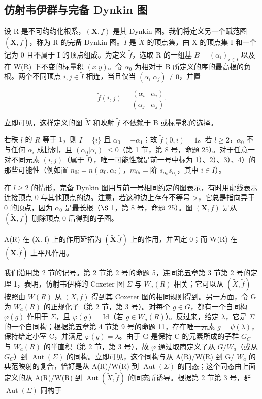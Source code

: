 \subsection{仿射韦伊群与完备 Dynkin 图}

设 R 是不可约约化根系，\((\mathbf{X}, f)\) 是其 Dynkin 图。我们将定义另一个赋范图 \((\tilde{\mathbf{X}}, \tilde{f})\)，称为 R 的完备 Dynkin 图。\(\tilde{I}\) 是 \(\tilde{X}\) 的顶点集，由 X 的顶点集 I 和一个记为 0 且不属于 I 的顶点组成。为定义 \(\tilde{f}\)，选取 R 的一组基 \(B = (\alpha_{i})_{i \in I}\) 以及在 W(R) 下不变的标量积 \((x|y)\)。令 \(\alpha_{0}\) 为相对于 B 所定义的序的最高根的负根。两个不同顶点 \(i, j \in \tilde{I}\) 相连，当且仅当 \((\alpha_{i}|\alpha_{j}) \neq 0\)，并置

\[
\tilde {f} (i, j) = \frac {\left(\alpha_ {i} \mid \alpha_ {i}\right)}{\left(\alpha_ {j} \mid \alpha_ {j}\right)}.
\]

立即可见，这样定义的图 \(\tilde{X}\) 和映射 \(\tilde{f}\) 不依赖于 B 或标量积的选择。

若秩 \(l\) 的 \(R\) 等于 1，则 \(I = \{i\}\) 且 \(\alpha_0 = -\alpha_1\)；故 \(\tilde{f}(0, i) = 1\)。若 \(l \geqslant 2\)，\(\alpha_0\) 不与任何 \(\alpha_i\) 成比例，且 \((\alpha_0|\alpha_i)\) \(\leqslant 0\)（第 1 节，第 8 号，命题 25）。对于任意一对不同元素 \((i,j)\)（属于 \(\tilde{I}\)），唯一可能性就是前一号中标为 1）、2）、3）、4）的那些可能性（例如置 \(n_{0i} = n(\alpha_0, \alpha_i)\)，\(m_{0i} = \text{阶 } s_{\alpha_0}s_{\alpha_i}\)，其中 \(i \in I\)）。

在 \(l \geqslant 2\) 的情形，完备 Dynkin 图用与前一号相同约定的图表示，有时用虚线表示连接顶点 0 与其他顶点的边。注意，若这种边上存在不等号 \textgreater{}，它总是指向异于 0 的顶点，因为 \(\alpha_{0}\) 是最长根（\(\S\) 1，第 8 号，命题 25）。图 \((\mathbf{X}, f)\) 是从 \((\tilde{\mathbf{X}}, f)\) 删除顶点 0 后得到的子图。

A(R) 在 (X. f) 上的作用延拓为 \((\tilde{\mathbf{X}}.\tilde{f})\) 上的作用，并固定 0；而 W(R) 在 \((\tilde{\mathbf{X}}.\tilde{f})\) 上平凡作用。

我们沿用第 2 节的记号。第 2 节第 2 号的命题 5，连同第五章第 3 节第 2 号的定理 1，表明，仿射韦伊群的 Coxeter 图 \(\Sigma\) 与 \(W_{a}(R)\) 相关；它可以从 \((\tilde{X},\tilde{f})\) 按照由 \(W(R)\) 从 \((X,f)\) 得到其 Coxeter 图的相同规则得到。另一方面，令 G 为 \(W_{a}(R)\) 的正规化子（第 2 节，第 3 号）。对每个 \(g\in G\)，都有一个自同构 \(\varphi(g)\) 作用于 \(\Sigma\)，且 \(\varphi(g)=\mathrm{Id}\)（若 \(g\in W_{a}(R)\)）。反过来，给定 \(\lambda\)，它是 \(\Sigma\) 的一个自同构；根据第五章第 4 节第 9 号的命题 11，存在唯一元素 \(g=\psi(\lambda)\)，保持给定小室 C，并满足 \(\varphi(g)=\lambda\)。由于 G 是保持 C 的元素所成的子群 \(G_{C}\) 与 \(W_{a}(R)\) 的半直积（第 2 节，第 3 号），故 \(\varphi\) 通过取商定义了从 \(G/W_{a}\)（或从 \(G_{C}\)）到 \(\operatorname{Aut}(\Sigma)\) 的同构。立即可见，这个同构与从 A(R)/W(R) 到 G/ \(W_{a}\) 的典范映射的复合，恰好是从 A(R)/W(R) 到 \(\operatorname{Aut}(\Sigma)\) 的同态；这个同态由上面定义的从 A(R)/W(R) 到 \(\operatorname{Aut}(\tilde{X},\tilde{f})\) 的同态所诱导。根据第 2 节第 3 号，群 \(\operatorname{Aut}(\Sigma)\) 同构于

